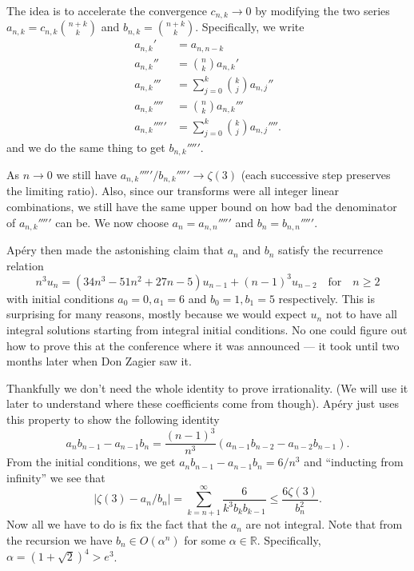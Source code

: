 \documentclass[12 pt, letterpaper]{amsart}
\begin{document}
The idea is to accelerate the convergence $c_{n, k} \to 0$ by modifying the two series $a_{n, k} = c_{n, k} \binom{n + k}{k}$ and $b_{n, k} = \binom{n + k}{k}$. Specifically, we write
\begin{align*}
	a_{n, k}' & = a_{n, n - k} \\
	a_{n, k}'' & = \binom{n}{k} a_{n, k}' \\
	a_{n, k}''' & = \sum_{j = 0}^{k} \binom{k}{j} a_{n, j}'' \\
	a_{n, k}'''' & = \binom{n}{k} a_{n, k}''' \\
	a_{n, k}''''' & = \sum_{j = 0}^{k} \binom{k}{j} a_{n, j}''''.
\end{align*}
and we do the same thing to get $b_{n, k}'''''$. 

As $n \to 0$ we still have $a_{n, k}''''' / b_{n, k}''''' \to \zeta(3)$ (each successive step preserves the limiting ratio). Also, since our transforms were all integer linear combinations, we still have the same upper bound on how bad the denominator of $a_{n, k}'''''$ can be. We now choose $a_{n} = a_{n, n}'''''$ and $b_{n} = b_{n, n}'''''$.

Ap\'ery then made the astonishing claim that $a_{n}$ and $b_{n}$ satisfy the recurrence relation
\[
	n^{3} u_{n} = (34 n^{3} - 51 n^{2} + 27 n - 5) u_{n - 1} + (n - 1)^{3} u_{n - 2} \quad \text{for} \quad n \ge 2
\]
with initial conditions $a_{0} = 0, a_{1} = 6$ and $b_{0} = 1, b_{1} = 5$ respectively. This is surprising for many reasons, mostly because we would expect $u_{n}$ not to have all integral solutions starting from integral initial conditions. No one could figure out how to prove this at the conference where it was announced --- it took until two months later when Don Zagier saw it. 

Thankfully we don't need the whole identity to prove irrationality. (We will use it later to understand where these coefficients come from though). Ap\'ery just uses this property to show the following identity
\[
	a_{n} b_{n - 1} - a_{n - 1} b_{n} = \frac{(n - 1)^3}{n^{3}} (a_{n - 1} b_{n - 2} - a_{n - 2} b_{n - 1}).
\]
From the initial conditions, we get $a_{n} b_{n - 1} - a_{n - 1} b_{n} = 6 / n^{3}$ and ``inducting from infinity'' we see that
\[
	\lvert \zeta(3) - a_{n} / b_{n} \rvert = \sum_{k = n + 1}^{\infty} \frac{6}{k^{3} b_{k} b_{k - 1}} \le \frac{6 \zeta(3)}{b_{n}^{2}}.
\]
Now all we have to do is fix the fact that the $a_{n}$ are not integral. Note that from the recursion we have $b_{n} \in O(\alpha^{n})$ for some $\alpha \in \mathbb{R}$. Specifically, $\alpha = (1 + \sqrt{2})^{4} > e^{3}$. 
\end{document}
